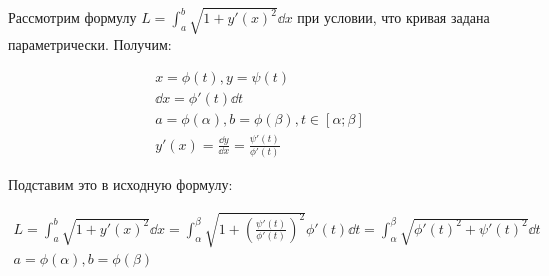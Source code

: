 
Рассмотрим формулу \(L = \int_{a}^{b} \sqrt{1 + y'(x)^2} \dd x\) при условии,
что кривая задана параметрически. Получим:

\begin{align*}
  x = \phi(t), y = \psi(t) \\
  \dd x = \phi'(t) \dd t \\
  a = \phi(\alpha), b = \phi(\beta), t \in [\alpha; \beta] \\
  y'(x) = \frac{\dd y}{\dd x} = \frac{\psi'(t)}{\phi'(t)}
\end{align*}

Подставим это в исходную формулу:

\begin{align*}
  L
  = \int_{a}^{b} \sqrt{1 + y'(x)^2} \dd x
  = \int_{\alpha}^{\beta}
    \sqrt{1 + \left(\frac{\psi'(t)}{\phi'(t)}\right)^2} \phi'(t) \dd t
  = \int_{\alpha}^{\beta} \sqrt{\phi'(t)^2 + \psi'(t)^2} \dd t \\
  a = \phi(\alpha), b = \phi(\beta)
\end{align*}